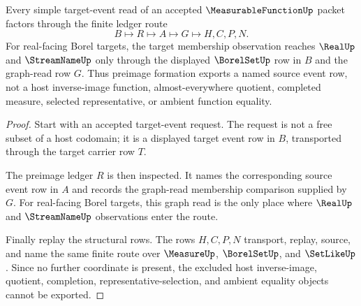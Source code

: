 \begin{theorem}
\label{thm:measurable-function-simple-preimage-ledger}
Every simple target-event read of an accepted $\MeasurableFunctionUp$ packet factors through the finite ledger route
$$
B \longmapsto R \longmapsto A \longmapsto G \longmapsto H,C,P,N .
$$
For real-facing Borel targets, the target membership observation reaches $\RealUp$ and $\StreamNameUp$ only through the displayed $\BorelSetUp$ row in $B$ and the graph-read row $G$. Thus preimage formation exports a named source event row, not a host inverse-image function, almost-everywhere quotient, completed measure, selected representative, or ambient function equality.
\end{theorem}
\begin{proof}
Start with an accepted target-event request. The request is not a free subset of a host codomain; it is a displayed target event row in $B$, transported through the target carrier row $T$.

The preimage ledger $R$ is then inspected. It names the corresponding source event row in $A$ and records the graph-read membership comparison supplied by $G$. For real-facing Borel targets, this graph read is the only place where $\RealUp$ and $\StreamNameUp$ observations enter the route.

Finally replay the structural rows. The rows $H,C,P,N$ transport, replay, source, and name the same finite route over $\MeasureUp$, $\BorelSetUp$, and $\SetLikeUp$. Since no further coordinate is present, the excluded host inverse-image, quotient, completion, representative-selection, and ambient equality objects cannot be exported.
\end{proof}



